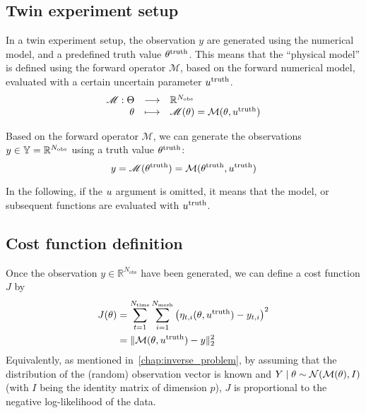 \documentclass[../../Main_ManuscritThese.tex]{subfiles}
\begin{document}
\subsection{Twin experiment setup}
In a twin experiment setup, the observation $y$ are generated using
the numerical model, and a predefined truth value
$\theta^{\mathrm{truth}}$.  This means that the ``physical model'' is
defined using the forward operator $\mathscr{M}$, based on the forward
numerical model, evaluated with a certain uncertain parameter
$u^{\mathrm{truth}}$.
\begin{equation}
  \label{eq:twin_exp}
  \begin{array}{rcl}
    \mathscr{M}: \Theta &\longrightarrow & \mathbb{R}^{N_{\mathrm{obs}}} \\
    \theta & \longmapsto &\mathscr{M}(\theta) = \mathcal{M}(\theta, u^{\mathrm{truth}})
  \end{array}
\end{equation}

Based on the forward operator $\mathscr{M}$, we can generate the observations $y\in \mathbb{Y} = \mathbb{R}^{N_{\mathrm{obs}}}$ using a truth value $\theta^{\mathrm{truth}}$:
\begin{equation}
  y = \mathscr{M}(\theta^{\mathrm{truth}}) = \mathcal{M}(\theta^{\mathrm{truth}}, u^{\mathrm{truth}})
\end{equation}

In the following, if the $u$ argument is omitted, it means that the
model, or subsequent functions are evaluated with
$u^{\mathrm{truth}}$.
\subsection{Cost function definition}
Once the observation $y \in \mathbb{R}^{N_{\mathrm{obs}}}$ have been generated, we can
define a cost function $J$ by
\begin{align}
  \label{eq:cost_fun_definition}
  J(\theta) &= \sum_{t=1}^{ N_{\mathrm{time}}}\sum_{i=1}^{N_{\mathrm{mesh}}}  \left(\eta_{t,i}(\theta,u^{\mathrm{truth}}) - y_{t, i}\right)^2 \\
         &= \|\mathcal{M}(\theta,u^{\mathrm{truth}}) - y\|_2^2
\end{align}
Equivalently, as mentioned in~\cref{chap:inverse_problem}, by assuming
that the distribution of the (random) observation vector is known and
$Y \mid \theta \sim \mathcal{N}(\mathcal{M}(\theta), I)$ (with $I$ being the
identity matrix of dimension $p$), $J$ is proportional to the negative
log-likelihood of the data.
\end{document}
